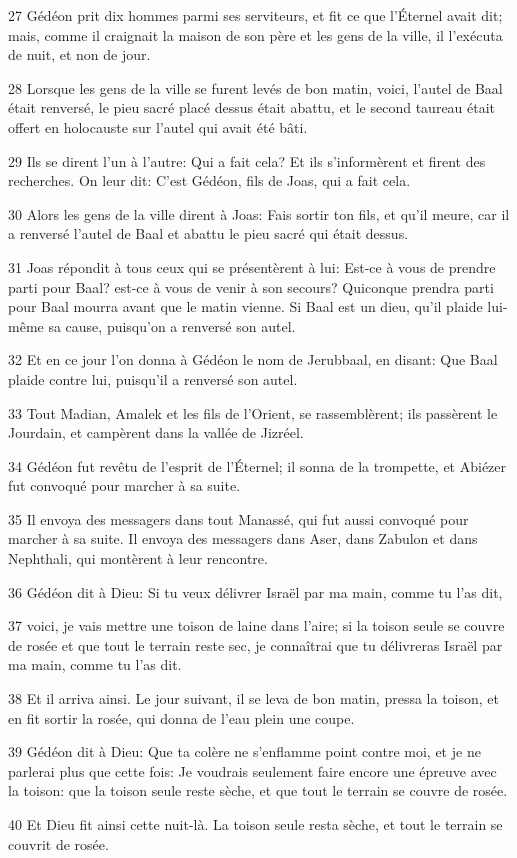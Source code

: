\par 27 Gédéon prit dix hommes parmi ses serviteurs, et fit ce que l'Éternel avait dit; mais, comme il craignait la maison de son père et les gens de la ville, il l'exécuta de nuit, et non de jour.
\par 28 Lorsque les gens de la ville se furent levés de bon matin, voici, l'autel de Baal était renversé, le pieu sacré placé dessus était abattu, et le second taureau était offert en holocauste sur l'autel qui avait été bâti.
\par 29 Ils se dirent l'un à l'autre: Qui a fait cela? Et ils s'informèrent et firent des recherches. On leur dit: C'est Gédéon, fils de Joas, qui a fait cela.
\par 30 Alors les gens de la ville dirent à Joas: Fais sortir ton fils, et qu'il meure, car il a renversé l'autel de Baal et abattu le pieu sacré qui était dessus.
\par 31 Joas répondit à tous ceux qui se présentèrent à lui: Est-ce à vous de prendre parti pour Baal? est-ce à vous de venir à son secours? Quiconque prendra parti pour Baal mourra avant que le matin vienne. Si Baal est un dieu, qu'il plaide lui-même sa cause, puisqu'on a renversé son autel.
\par 32 Et en ce jour l'on donna à Gédéon le nom de Jerubbaal, en disant: Que Baal plaide contre lui, puisqu'il a renversé son autel.
\par 33 Tout Madian, Amalek et les fils de l'Orient, se rassemblèrent; ils passèrent le Jourdain, et campèrent dans la vallée de Jizréel.
\par 34 Gédéon fut revêtu de l'esprit de l'Éternel; il sonna de la trompette, et Abiézer fut convoqué pour marcher à sa suite.
\par 35 Il envoya des messagers dans tout Manassé, qui fut aussi convoqué pour marcher à sa suite. Il envoya des messagers dans Aser, dans Zabulon et dans Nephthali, qui montèrent à leur rencontre.
\par 36 Gédéon dit à Dieu: Si tu veux délivrer Israël par ma main, comme tu l'as dit,
\par 37 voici, je vais mettre une toison de laine dans l'aire; si la toison seule se couvre de rosée et que tout le terrain reste sec, je connaîtrai que tu délivreras Israël par ma main, comme tu l'as dit.
\par 38 Et il arriva ainsi. Le jour suivant, il se leva de bon matin, pressa la toison, et en fit sortir la rosée, qui donna de l'eau plein une coupe.
\par 39 Gédéon dit à Dieu: Que ta colère ne s'enflamme point contre moi, et je ne parlerai plus que cette fois: Je voudrais seulement faire encore une épreuve avec la toison: que la toison seule reste sèche, et que tout le terrain se couvre de rosée.
\par 40 Et Dieu fit ainsi cette nuit-là. La toison seule resta sèche, et tout le terrain se couvrit de rosée.

